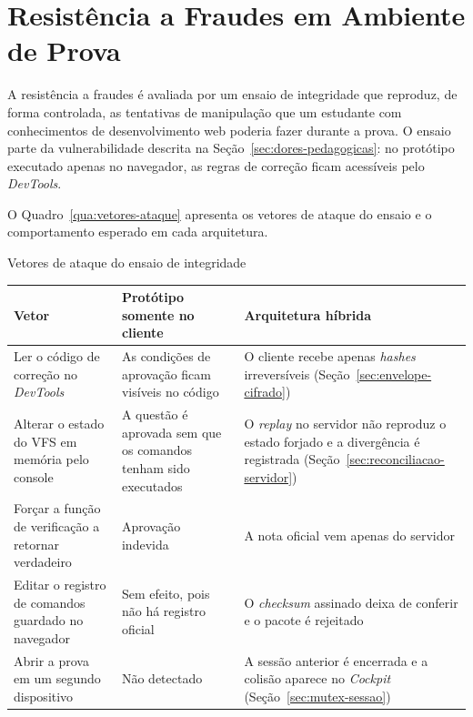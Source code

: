 \section{Resistência a Fraudes em Ambiente de Prova}
\label{sec:resistencia-fraudes}

A resistência a fraudes é avaliada por um ensaio de integridade que reproduz, de forma controlada, as tentativas de manipulação que um estudante com conhecimentos de desenvolvimento web poderia fazer durante a prova. O ensaio parte da vulnerabilidade descrita na Seção~\ref{sec:dores-pedagogicas}: no protótipo executado apenas no navegador, as regras de correção ficam acessíveis pelo \textit{DevTools}.

O Quadro~\ref{qua:vetores-ataque} apresenta os vetores de ataque do ensaio e o comportamento esperado em cada arquitetura.

\begin{quadro}[htbp]
    \caption{Vetores de ataque do ensaio de integridade}
    \label{qua:vetores-ataque}
    \footnotesize
    \begin{tabularx}{\textwidth}{|p{3.4cm}|L|L|}
        \hline
        \textbf{Vetor} & \textbf{Protótipo somente no cliente} & \textbf{Arquitetura híbrida} \\
        \hline
        Ler o código de correção no \textit{DevTools} & As condições de aprovação ficam visíveis no código & O cliente recebe apenas \textit{hashes} irreversíveis (Seção~\ref{sec:envelope-cifrado}) \\
        \hline
        Alterar o estado do VFS em memória pelo console & A questão é aprovada sem que os comandos tenham sido executados & O \textit{replay} no servidor não reproduz o estado forjado e a divergência é registrada (Seção~\ref{sec:reconciliacao-servidor}) \\
        \hline
        Forçar a função de verificação a retornar verdadeiro & Aprovação indevida & A nota oficial vem apenas do servidor \\
        \hline
        Editar o registro de comandos guardado no navegador & Sem efeito, pois não há registro oficial & O \textit{checksum} assinado deixa de conferir e o pacote é rejeitado \\
        \hline
        Abrir a prova em um segundo dispositivo & Não detectado & A sessão anterior é encerrada e a colisão aparece no \textit{Cockpit} (Seção~\ref{sec:mutex-sessao}) \\
        \hline
    \end{tabularx}
\end{quadro}

